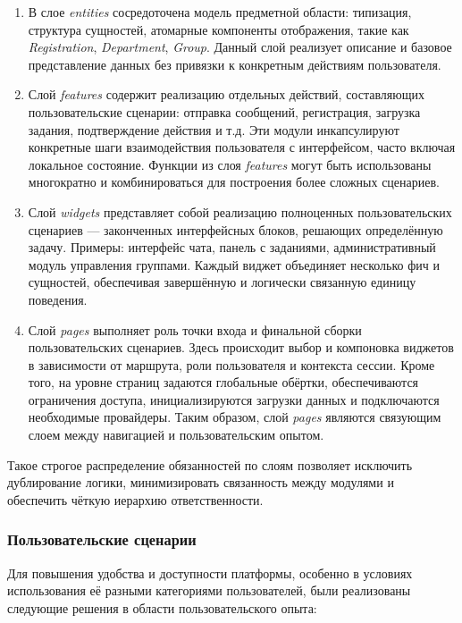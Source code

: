 \begin{enumerate}
  	\item В слое \textit{entities} сосредоточена модель предметной области: типизация, структура сущностей, атомарные компоненты отображения, такие как \textit{Registration}, \textit{Department}, \textit{Group}. Данный слой реализует описание и базовое представление данных без привязки к конкретным действиям пользователя.
	\item Слой \textit{features} содержит реализацию отдельных действий, составляющих пользовательские сценарии: отправка сообщений, регистрация, загрузка задания, подтверждение действия и т.д. Эти модули инкапсулируют конкретные шаги взаимодействия пользователя с интерфейсом, часто включая локальное состояние. Функции из слоя \textit{features} могут быть использованы многократно и комбинироваться для построения более сложных сценариев.
	\item Слой \textit{widgets} представляет собой реализацию полноценных пользовательских сценариев — законченных интерфейсных блоков, решающих определённую задачу. Примеры: интерфейс чата, панель с заданиями, административный модуль управления группами. Каждый виджет объединяет несколько фич и сущностей, обеспечивая завершённую и логически связанную единицу поведения.
	\item Слой \textit{pages} выполняет роль точки входа и финальной сборки пользовательских сценариев. Здесь происходит выбор и компоновка виджетов в зависимости от маршрута, роли пользователя и контекста сессии. Кроме того, на уровне страниц задаются глобальные обёртки, обеспечиваются ограничения доступа, инициализируются загрузки данных и подключаются необходимые провайдеры. Таким образом, слой \textit{pages} являются связующим слоем между навигацией и пользовательским опытом.
\end{enumerate}

Такое строгое распределение обязанностей по слоям позволяет исключить дублирование логики, минимизировать связанность между модулями и обеспечить чёткую иерархию ответственности.

\subsubsection{Пользовательские сценарии}

Для повышения удобства и доступности платформы, особенно в условиях использования её разными категориями пользователей, были реализованы следующие решения в области пользовательского опыта:


